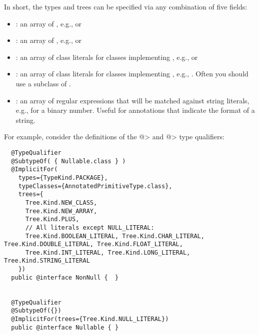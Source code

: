 In short, the types and trees can be
specified via any combination of five fields:

  \begin{itemize}
  \item {}: an array of
    , e.g.,
     or 
  \item {}: an array of
    , e.g., 
    or 
  \item {}: an array of class literals for classes
    implementing , e.g.,
     or 
  \item {}: an array of class literals for classes
    implementing , e.g.,
    .  Often you should use
    a subclass of .
  \item {}: an array of regular expressions that will
    be matched against
    string literals, e.g.,  for a binary number.  Useful
    for annotations that indicate the format of a string.
  \end{itemize}

For example, consider the definitions of the \<@> and \<@>
type qualifiers:

\begin{smaller}
\begin{Verbatim}
  @TypeQualifier
  @SubtypeOf( { Nullable.class } )
  @ImplicitFor(
    types={TypeKind.PACKAGE},
    typeClasses={AnnotatedPrimitiveType.class},
    trees={
      Tree.Kind.NEW_CLASS,
      Tree.Kind.NEW_ARRAY,
      Tree.Kind.PLUS,
      // All literals except NULL_LITERAL:
      Tree.Kind.BOOLEAN_LITERAL, Tree.Kind.CHAR_LITERAL, Tree.Kind.DOUBLE_LITERAL, Tree.Kind.FLOAT_LITERAL,
      Tree.Kind.INT_LITERAL, Tree.Kind.LONG_LITERAL, Tree.Kind.STRING_LITERAL
    })
  public @interface NonNull {  }


  @TypeQualifier
  @SubtypeOf({})
  @ImplicitFor(trees={Tree.Kind.NULL_LITERAL})
  public @interface Nullable { }
\end{Verbatim}
\end{smaller}

